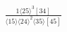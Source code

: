 \documentclass[varwidth, border=5pt]{standalone}
\begin{document}
\begin{my}
$\begin{gathered}
\scriptscriptstyle\frac{1⟨25⟩^3[34]}{⟨15⟩⟨24⟩^2⟨35⟩[45]}
\end{gathered}$
\end{my}
\end{document}
